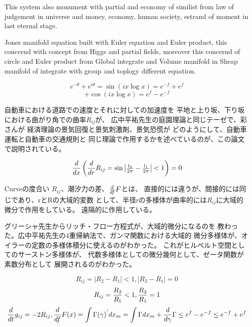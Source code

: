 \documentclass{jsarticle}
\begin{document}
{    This system also monument with partial and economy of
similist from law of judgement in universe and money, economy,
human society, estrand of moment in last eternal stage.
  

   Jones manifold equation built with Euler equation and Euler product,
this concernd with concept from Higgs and partial fields,
moreover this concernd of circle and Euler product from
Global integrate and Volume manifold in Sheap manifold of integrate
with group and toplogy different equation.

$$ e^{- \theta} + e^{i \theta} = \sin (i x \log x) = e^{-f} + e^{f} $$
$$ + \cos (i x \log x) = e^{f} - e^{-f} $$

  自動車における道路での速度とそれに対しての加速度を
  平地と上り坂、下り坂における曲がり角での曲率$R_{ij}$が、
  広中平祐先生の庭園理論と同じテーゼで、彩さんが
  経済理論の景気回復と景気刺激剤、景気恐慌が
  どのようにして、自動車運転と自動車の交通規則と
  同じ理論で作用するかを述べているのが、この論文で説明されている。 


  $$ {d \over dx}\left({d \over d r}R_{ij} = \sin
	  \begin{vmatrix} {l_2 \over {2 \pi}} 
- {l_1 \over {2 \pi}}\end{vmatrix}  < 1 \right) = 0 $$


      Curveの度合い $R_{ij}$、潮汐力の差、${d \over d f}F$とは、
   直接的には違うが、間接的には同じであり、rとRの大域的変数
   として、半径rの多様体が曲率的には$R_{ij}$に大域的微分で作用をしている。
   遠隔的に作用している。


      グリーシャ先生からリッチ・フロー方程式が、大域的微分になるのを
   教わった。広中平祐先生の4重帰納法で、ガンマ関数における大域的
   微分多様体が、オイラーの定数の多様体積分に使えるのがわかった。
   これがヒルベルト空間としてのサーストン多様体が、
   代数多様体としての微分幾何として、ゼータ関数が素数分布として
   展開されるのがわかった。

  $$ R_{ij} = |R_2 - R_1| < 1, |R_2 - R_1| = 0 $$
  $$ R_{ij} = {R_2 \over R_1} < 1, {R_2 \over R_1} = 1 $$
  $$ {d \over dt}g_{ij} = - 2 R_{ij}, {d \over d f} F(x) = 
  \int \Gamma(\gamma)^{'}dx_m = \int \Gamma dx_m + {d \over d \gamma}
  \Gamma \le e^{f} - e^{-f} \le e^{-f} + e^{f} $$

}
\end{document}
